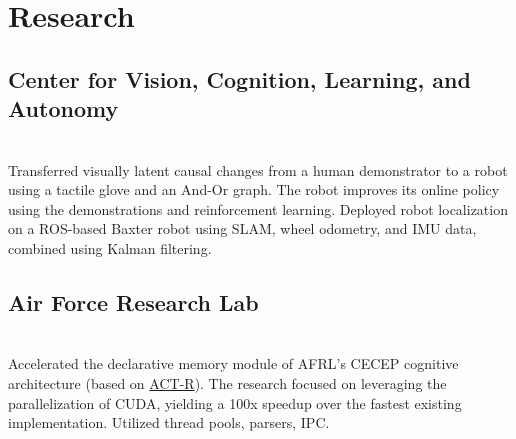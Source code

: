 \documentclass[letterpaper]{deedy-resume} %
\begin{document}
\begin{minipage}[t]{0.66\textwidth} %


\section{Research}

\subsection{Center for Vision, Cognition, Learning, and Autonomy}
 \hfill {} \\ 
\smallsectionspace
Transferred visually latent causal changes from a human demonstrator to a robot using a tactile glove and an And-Or graph. The robot improves its online policy using the demonstrations and reinforcement learning. Deployed robot localization on a ROS-based Baxter robot using SLAM, wheel odometry, and IMU data, combined using Kalman filtering.

\sectionspace %


\subsection{Air Force Research Lab}
 \hfill {} \\
\smallsectionspace %
Accelerated the declarative memory module of AFRL's CECEP cognitive architecture (based on \href{http://act-r.psy.cmu.edu/}{ACT-R}). The research focused on leveraging the parallelization of CUDA, yielding a 100x speedup over the fastest existing implementation. Utilized thread pools, parsers, IPC.

\sectionspace %




\end{minipage}
\end{document}
